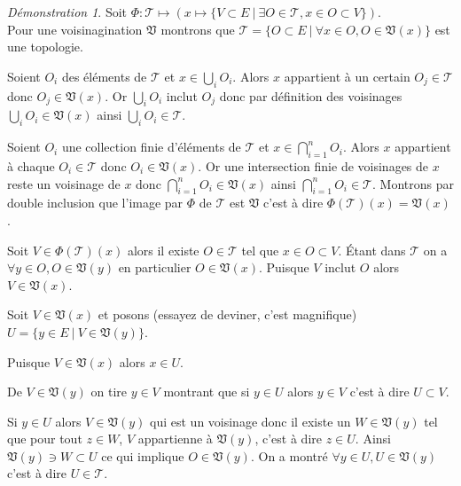 \documentclass[a4paper, 11pt, french]{book}
\newenvironment{itemise}{\itemize}{\enditemize}
\theoremstyle{plain} %
\theoremstyle{definition} %
\theoremstyle{remark} %
\newtheorem*{demonstration}{Démonstration}
\newcommand{\1}{\mathds{1}}
\begin{document}
\begin{demonstration}
	Soit $\Phi:\mathscr{T}\mapsto(x\mapsto\{V\subset E\ |\ \exists O\in\mathscr{T}, x\in O\subset V\})$. \\
	Pour une voisinagination $\mathfrak{V}$ montrons que $\mathscr{T}=\{O\subset E\ |\ \forall x\in O, O\in\mathfrak{V}(x)\}$ est une topologie.
	\begin{itemise}
		\item Soient $O_i$ des éléments de $\mathscr{T}$ et $x\in\bigcup_iO_i$.
		Alors $x$ appartient à un certain $O_j\in\mathscr{T}$ donc $O_j\in\mathfrak{V}(x)$.
		Or $\bigcup_iO_i$ inclut $O_j$ donc par définition des voisinages $\bigcup_iO_i\in\mathfrak{V}(x)$ ainsi $\bigcup_iO_i\in\mathscr{T}$.
		\item Soient $O_i$ une collection finie d'éléments de $\mathscr{T}$ et $x\in\bigcap_{i=1}^nO_i$.
		Alors $x$ appartient à chaque $O_i\in\mathscr{T}$ donc $O_i\in\mathfrak{V}(x)$.
		Or une intersection finie de voisinages de $x$ reste un voisinage de $x$ donc $\bigcap_{i=1}^nO_i\in\mathfrak{V}(x)$ ainsi $\bigcap_{i=1}^nO_i\in\mathscr{T}$.
	\end{itemise}
	Montrons par double inclusion que l'image par $\Phi$ de $\mathscr{T}$ est $\mathfrak{V}$ c'est à dire $\Phi(\mathscr{T})(x)=\mathfrak{V}(x)$.
	\begin{itemise}
		\item Soit $V\in\Phi(\mathscr{T})(x)$ alors il existe $O\in\mathscr{T}$ tel que $x\in O\subset V$.
		Étant dans $\mathscr{T}$ on a $\forall y\in O, O\in\mathfrak{V}(y)$ en particulier $O\in\mathfrak{V}(x)$.
		Puisque $V$ inclut $O$ alors $V\in\mathfrak{V}(x)$.
		\item Soit $V\in\mathfrak{V}(x)$ et posons (essayez de deviner, c'est magnifique) $U=\{y\in E\ |\ V\in\mathfrak{V}(y)\}$.
		\begin{itemise}
			\item Puisque $V\in\mathfrak{V}(x)$ alors $x\in U$.
			\item De $V\in\mathfrak{V}(y)$ on tire $y\in V$ montrant que si $y\in U$ alors $y\in V$ c'est à dire $U\subset V$.
			\item Si $y\in U$ alors $V\in\mathfrak{V}(y)$ qui est un voisinage donc il existe un $W\in\mathfrak{V}(y)$ tel que pour tout $z\in W$, $V$ appartienne à $\mathfrak{V}(y)$, c'est à dire $z\in U$.
			Ainsi $\mathfrak{V}(y)\ni W\subset U$ ce qui implique $O\in\mathfrak{V}(y)$.
			On a montré $\forall y\in U, U\in\mathfrak{V}(y)$ c'est à dire $U\in\mathscr{T}$.
		\end{itemise}

\end{itemise}
\end{demonstration}
\end{document}
